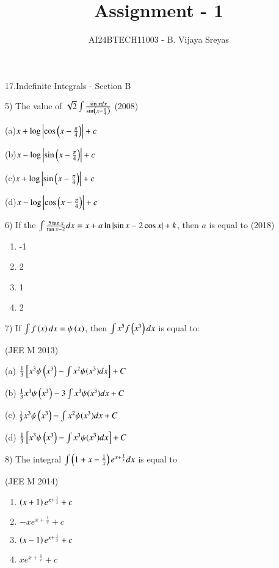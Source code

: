 \documentclass[journal,12pt,twocolumn]{IEEEtran}
\theoremstyle{remark}
\begin{document}

\vspace{3cm}

\title{Assignment - 1}
\author{AI24BTECH11003 - B. Vijaya Sreyas}
\maketitle
\newpage
\bigskip

\renewcommand{\thefigure}{\theenumi}
\renewcommand{\thetable}{\theenumi}

17.Indefinite Integrals - Section B

5)
	 The value of $\sqrt{2}\int\frac{\sin xdx}{\sin \left(x-\frac{\pi}{4}\right)}$
		\hfill{(2008)}

		(a)$x+\log\left\vert\cos \left(x-\frac{\pi}{4}\right)\right\vert+c$

		(b)$x-\log\left\vert\sin \left(x-\frac{\pi}{4}\right)\right\vert+c$

		(c)$x+\log\left\vert\sin \left(x-\frac{\pi}{4}\right)\right\vert+c$

		(d)$x-\log\left\vert\cos \left(x-\frac{\pi}{4}\right)\right\vert+c$

6)
	 If the $\int\frac{5\tan x}{\tan x-2}dx=x+a\ln \left\vert\sin x-2\cos x\right\vert+k$, then $a$ is equal to
		\hfill{(2018)}

		\begin{multicols}{4}
			\begin{enumerate}[label=(\alph*)]
				\item -1
				\item 2
				\item 1
				\item 2
			\end{enumerate}
		\end{multicols}
		
7)
	If $\int f\left(x\right)dx=\psi\left(x\right)$, then $\int x^5f\left(x^3\right)dx$ is equal to:

		\hfill{(JEE M 2013)}

		(a) $\frac{1}{3}{}\left[x^3\psi\left(x^3\right)-\int x^2\psi(x^3)dx\right] + C$

		(b) $\frac{1}{3}x^3\psi\left(x^3\right)-3\int x^3\psi(x^3)dx + C$

		(c) $\frac{1}{3}x^3\psi\left(x^3\right)-\int x^2\psi(x^3)dx + C$

		(d) $\frac{1}{3}{}\left[x^3\psi\left(x^3\right)-\int x^3\psi(x^3)dx\right] + C$

8)
	 The integral $\int\left(1+x-\frac{1}{x}\right)e^{x+\frac{1}{x}}dx$ is equal to

		\hfill{(JEE M 2014)}

		\begin{multicols}{2}
			\begin{enumerate}[label=(\alph*)]
				\item $\left(x+1\right)e^{x+\frac{1}{x}}+c$
				\item $-xe^{x+\frac{1}{x}}+c$
				\item $\left(x-1\right)e^{x+\frac{1}{x}}+c$
				\item $xe^{x+\frac{1}{x}}+c$
			\end{enumerate}
		\end{multicols}
\end{document}

